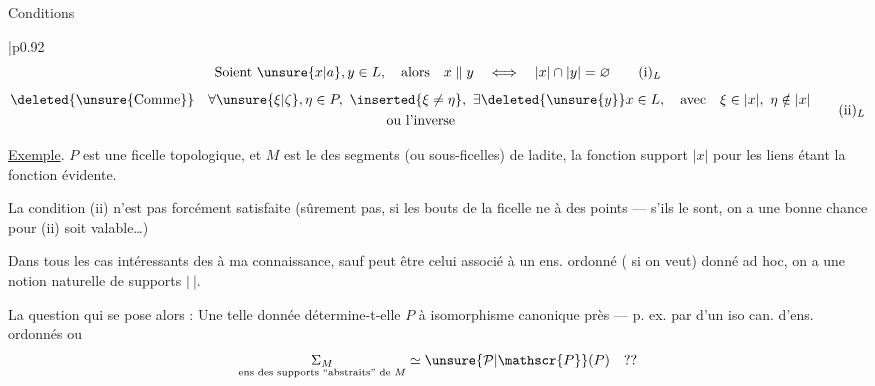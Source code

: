 
Conditions
\begin{tabular}{|p{0.92\linewidth}}
\[
\text{Soient }\unsure{x|a},y\in L,\quad\text{alors}\quad
x\parallel y\quad\Longleftrightarrow\quad |x|\cap|y|=\varnothing
\tag*{$(\mathrm{i})_L$}
\]
\[
\begin{aligned}
&\deleted{\text{\unsure{Comme}}}\quad\forall\unsure{\xi|\zeta},\eta\in P,
\ \inserted{\xi\ne\eta},\ \exists\deleted{\unsure{y}}x\in L,\quad\text{avec}\quad
\xi\in|x|,\ \eta\notin|x|\\
&\hspace{27em}\text{ou l'inverse}
\end{aligned}
\tag*{$(\mathrm{ii})_L$}
\]

\end{tabular}

\uline{Exemple}. $P$ est une ficelle topologique,  et $M$ est le  des  segments (ou sous-ficelles) de ladite, la fonction support $|x|$  pour les liens étant la fonction évidente.

La condition (ii) n'est pas forcément satisfaite (sûrement pas, si les bouts de la ficelle ne   à des points --- s'ils le sont, on a une bonne chance pour (ii) soit valable\ldots)

Dans tous les cas intéressants des  à ma connaissance, sauf peut être celui  associé à un ens. ordonné ( si on veut) donné ad hoc, on a une notion naturelle de supports $|\ |$.

La question qui se pose alors : Une telle donnée détermine-t-elle $P$ à isomorphisme canonique près --- p. ex. par  d'un iso can. d'ens. ordonnés ou   \unsure{(}
\[
\underset{\text{ens des supports ``abstraits'' de }M}{\Sigma_M}
\simeq\unsure{\mathcal{P}|\mathscr{P}}(P)\quad??
\]
